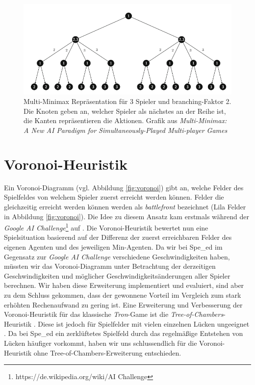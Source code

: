 \begin{figure}[ht]
    \centering
    \includegraphics[width=1\textwidth]{img/multiminimax.PNG}
    \caption[Multi-Minimax]{Multi-Minimax Repräsentation für 3 Spieler und branching-Faktor 2. Die Knoten geben an, welcher Spieler als nächstes an der Reihe ist, die Kanten repräsentieren die Aktionen. Grafik aus \textit{Multi-Minimax: A New AI Paradigm for Simultaneously-Played Multi-player Games \cite{Perez.2019}}}
	\label{fig:multiminimax}
\end{figure}

\section{Voronoi-Heuristik}
\label{cha:voronoi_sec}

Ein Voronoi-Diagramm (vgl. Abbildung \ref{fig:voronoi}) gibt an, welche Felder des Spielfeldes von welchem Spieler zuerst erreicht werden können. Felder die gleichzeitig erreicht werden können werden als \textit{battlefront} bezeichnet (Lila Felder in Abbildung \ref{fig:voronoi}). Die Idee zu diesem Ansatz kam erstmals während der \textit{Google AI Challenge}\footnote{https://de.wikipedia.org/wiki/AI Challenge} auf \cite{AndySloane.2010}. Die Voronoi-Heuristik bewertet nun eine Spielsituation basierend auf der Differenz der zuerst erreichbaren Felder des eigenen Agenten und des jeweiligen Min-Agenten. Da wir bei Spe\_ed im Gegensatz zur \textit{Google AI Challenge} verschiedene Geschwindigkeiten haben, müssten wir das Voronoi-Diagramm unter Betrachtung der derzeitigen Geschwindigkeiten und möglicher Geschwindigkeitsänderungen aller Spieler berechnen. Wir haben diese Erweiterung implementiert und evaluiert, sind aber zu dem Schluss gekommen, dass der gewonnene Vorteil im Vergleich zum stark erhöhten Rechenaufwand zu gering ist. Eine Erweiterung und Verbesserung der Voronoi-Heuristik für das klassische \textit{Tron}-Game ist die \textit{Tree-of-Chambers}-Heuristik \cite{AndySloane.2010, Kang.2012}. Diese ist jedoch für Spielfelder mit vielen einzelnen Lücken ungeeignet \cite{Kang.2012}. Da bei Spe\_ed ein zerklüftetes Spielfeld durch das regelmäßige Entstehen von Lücken häufiger vorkommt, haben wir uns schlussendlich für die Voronoi-Heuristik ohne Tree-of-Chambers-Erweiterung entschieden.

